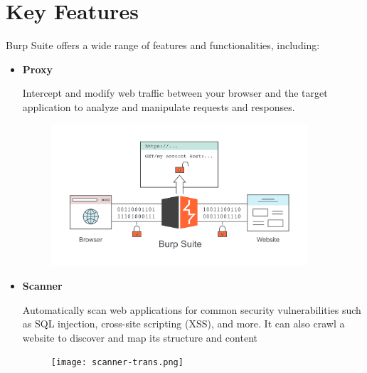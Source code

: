 \documentclass[
	a4paper, %
	12pt, %
]{CSSullivanBusinessReport}
\begin{document}
\section*{Key Features} 
\begin{fullwidth}
    Burp Suite offers a wide range of features and functionalities, including:
\end{fullwidth}
\begin{itemize}
\item \textbf{Proxy}
    \begin{fullwidth} 
        Intercept and modify web traffic between your browser and the target application to analyze and manipulate requests and responses.
    \end{fullwidth}

    \begin{figure}[h]
        \centering
        \includegraphics[width=0.9\textwidth]{Images/proxy.jpg}
        \label{fig:Burp-Proxy-img}
    \end{figure}
\item \textbf{Scanner}
    \begin{fullwidth}
        Automatically scan web applications for common security vulnerabilities such as SQL injection, cross-site scripting (XSS), and more. It can also crawl a website to discover and map its structure and content
    \end{fullwidth}
    
    \begin{figure}[H]            
        \centering
        \texttt{[image: scanner-trans.png]}                
        \label{fig:enter-label}
    \end{figure}


\end{itemize}
\end{document}
